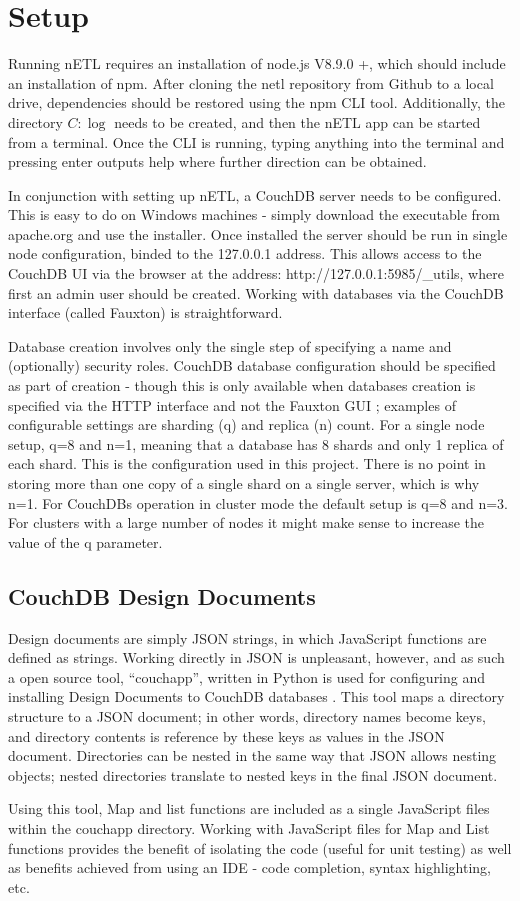 \section{Setup}
Running nETL requires an installation of node.js V8.9.0 +, which should include an installation of npm. After cloning the netl repository from Github to a local drive, dependencies should be restored using the npm CLI tool. Additionally, the directory $C:\log$ needs to be created, and then the nETL app can be started from a terminal. Once the CLI is running, typing anything into the terminal and pressing enter outputs help where further direction can be obtained.

In conjunction with setting up nETL, a CouchDB server needs to be configured. This is easy to do on Windows machines - simply download the executable from apache.org and use the installer. Once installed the server should be run in single node configuration, binded to the 127.0.0.1 address. This allows access to the CouchDB UI via the browser at the address: http://127.0.0.1:5985/\_utils, where first an admin user should be created. Working with databases via the CouchDB interface (called Fauxton) is straightforward.

Database creation involves only the single step of specifying a name and (optionally) security roles. CouchDB database configuration should be specified as part of creation - though this is only available when databases creation is specified via the HTTP interface and not the Fauxton GUI \cite{xxx}; examples of configurable settings are sharding (q) and replica (n) count. For a single node setup, q=8 and n=1, meaning that a database has 8 shards and only 1 replica of each shard. This is the configuration used in this project. There is no point in storing more than one copy of a single shard on a single server, which is why n=1. For CouchDBs operation in cluster mode the default setup is q=8 and n=3. For clusters with a large number of nodes it might make sense to increase the value of the q parameter.

\subsection{CouchDB Design Documents}
Design documents are simply JSON strings, in which JavaScript functions are defined as strings. Working directly in JSON is unpleasant, however, and as such a open source tool, ``couchapp'', written in Python is used for configuring and installing Design Documents to CouchDB databases \cite{pythonCouchapp}. This tool maps a directory structure to a JSON document; in other words, directory names become keys, and directory contents is reference by these keys as values in the JSON document. Directories can be nested in the same way that JSON allows nesting objects; nested directories translate to nested keys in the final JSON document.

Using this tool, Map and list functions are included as a single JavaScript files within the couchapp directory. Working with JavaScript files for Map and List functions provides the benefit of isolating the code (useful for unit testing) as well as benefits achieved from using an IDE - code completion, syntax highlighting, etc.